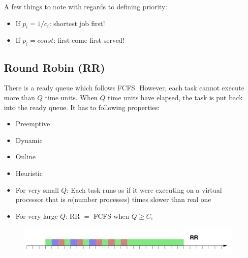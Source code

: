 \documentclass{hw}
\begin{document}
A few things to note with regards to defining priority:
\begin{itemize}
  \item If $p_{i} = 1/c_{i}$: shortest job first!
  \item If $p_{i} = const$: first come first served!
\end{itemize}

\subsection{Round Robin (RR)}
There is a ready queue which follows FCFS\@. However, each task cannot execute
more than $Q$ time units. When $Q$ time units have elapsed, the task is put
back into the ready queue. It has to following properties:
\begin{itemize}
  \item Preemptive
  \item Dynamic
  \item Online
  \item Heuristic
  \item For very small $Q$: Each task runs as if it were executing on a virtual 
    processor that is $n$(number processes) times slower than real one
  \item For very large $Q$: RR $=$ FCFS when $Q \geq C_{i}$
\end{itemize}

\begin{figure}[H]
  \centering
  \includegraphics[scale=.6]{img/rr}
\end{figure}
\end{document}
